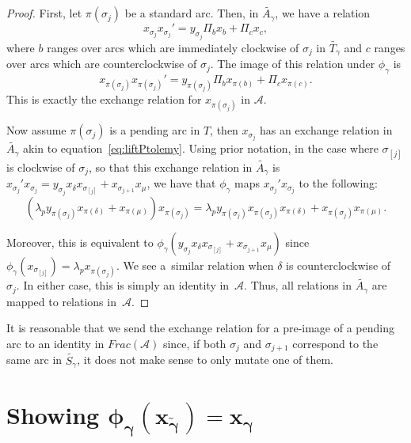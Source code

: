 \begin{proof}
First, let $\pi(\sigma_j)$ be a standard arc. Then, in $\widetilde{A_\gamma}$, we have a relation \begin{equation}\label{eq:liftPtolemy}
x_{\sigma_j}x_{\sigma_j}' = y_{\sigma_j} \Pi_b x_b + \Pi_c x_c, \end{equation} where $b$ ranges over arcs which are immediately clockwise of $\sigma_j$ in $\widetilde{T_\gamma}$ and $c$ ranges over arcs which are counterclockwise of $\sigma_j$. The image of this relation under $\phi_\gamma$ is \begin{equation}
x_{\pi(\sigma_j)}x_{\pi(\sigma_j)}' = y_{\pi(\sigma_j)}\Pi_b x_{\pi(b)} + \Pi_c x_{\pi(c)}.\end{equation} This is exactly the exchange relation for $x_{\pi(\sigma_j)}$ in $\mathcal{A}$.

 Now assume $\pi(\sigma_j)$ is a pending arc in $T$, then $x_{\sigma_j}$ has an exchange relation in $\widetilde{A_\gamma}$ akin to equation~\eqref{eq:liftPtolemy}. Using prior notation, in the case where $\sigma_{[j]}$ is clockwise of $\sigma_j$, so that this exchange relation in $\widetilde{A_\gamma}$ is $x_{\sigma_j}' x_{\sigma_j} = y_{\sigma_j} x_\delta x_{\sigma_{[j]}} + x_{\sigma_{j+1}} x_\mu$, we have that $\phi_\gamma$ maps $x_{\sigma_j}' x_{\sigma_j} $ to the following:\[
 ( \lambda_p y_{\pi(\sigma_j)} x_{\pi(\delta)} + x_{\pi(\mu)}) x_{\pi(\sigma_j)}= \lambda_p y_{\pi(\sigma_j)} x_{\pi(\sigma_j)}x_{\pi(\delta)} + x_{\pi(\sigma_j)} x_{\pi(\mu)}.
\]

Moreover, this is equivalent to $\phi_\gamma( y_{\sigma_j} x_\delta x_{\sigma_{[j]}} + x_{\sigma_{j+1}} x_\mu)$ since $\phi_\gamma(x_{\sigma_{[j]}}) = \lambda_p x_{\pi(\sigma_j)}$.
We see a~similar relation when $\delta$ is counterclockwise of~$\sigma_j$. In either case, this is simply an identity in~$\mathcal{A}$. Thus, all relations in $\widetilde{A_\gamma}$ are mapped to relations in~$\mathcal{A}$.
\end{proof}

\begin{Remark} It is reasonable that we send the exchange relation for a pre-image of a pending arc to an identity in $Frac(\mathcal{A})$ since, if both $\sigma_j$ and $\sigma_{j+1}$ correspond to the same arc in $\widetilde{S_\gamma}$, it does not make sense to only mutate one of them.
\end{Remark}

\section[Showing $\phi_\gamma(x_{\widetilde{\gamma}}) = x_\gamma$]{Showing $\boldsymbol{\phi_\gamma(x_{\widetilde{\gamma}}) = x_\gamma}$}\label{sec:mapClusterVar}

